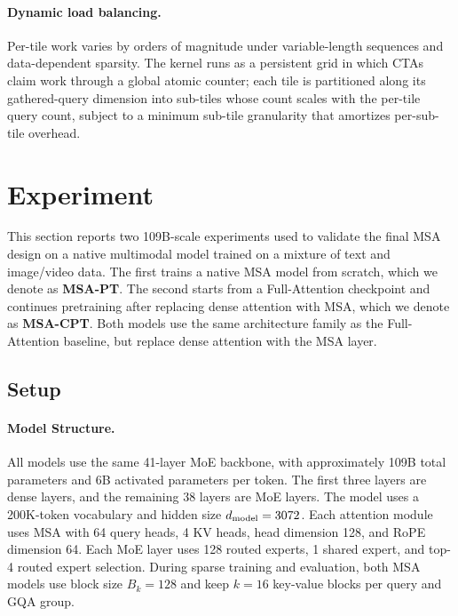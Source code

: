 \documentclass{llmxive}
\providecommand{\method}{\textsc{MSA}}
\begin{document}
\paragraph{Dynamic load balancing.}
Per-tile work varies by orders of magnitude under variable-length sequences and data-dependent sparsity. The kernel runs as a persistent grid in which CTAs claim work through a global atomic counter; each tile is partitioned along its gathered-query dimension into sub-tiles whose count scales with the per-tile query count, subject to a minimum sub-tile granularity that amortizes per-sub-tile overhead.

\section{Experiment}
\label{sec:experiment}

This section reports two 109B-scale experiments used to validate the final \method{} design on a native multimodal model trained on a mixture of text and image/video data. The first trains a native \method{} model from scratch, which we denote as \textbf{\method{}-PT}. The second starts from a Full-Attention checkpoint and continues pretraining after replacing dense attention with \method{}, which we denote as \textbf{\method{}-CPT}. Both models use the same architecture family as the Full-Attention baseline, but replace dense attention with the \method{} layer.


\subsection{Setup}
\label{sec:experiment-setup}

\paragraph{Model Structure.} All models use the same 41-layer MoE backbone, with approximately 109B total parameters and 6B activated parameters per token. The first three layers are dense layers, and the remaining 38 layers are MoE layers. The model uses a 200K-token vocabulary and hidden size $d_{\rm model}=3072$. Each attention module uses MSA with 64 query heads, 4 KV heads, head dimension 128, and RoPE dimension 64. Each MoE layer uses 128 routed experts, 1 shared expert, and top-4 routed expert selection. During sparse training and evaluation, both \method{} models use block size \(B_k=128\) and keep \(k=16\) key-value blocks per query and GQA group.
\end{document}
